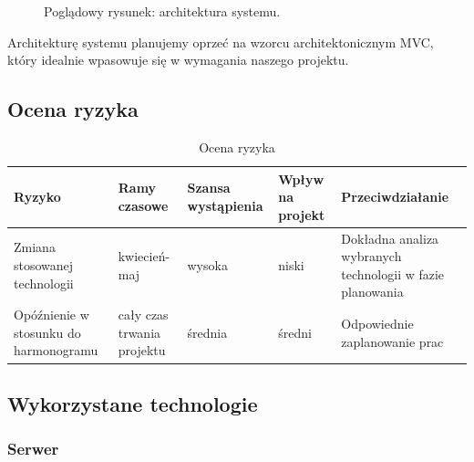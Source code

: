 \documentclass[12pt,a4paper]{report}
\begin{document}
\begin{figure}[H]
\centering
\caption{Poglądowy rysunek: architektura systemu.}
\label{im_overview}
\hspace*{0cm}
\end{figure}

Architekturę systemu planujemy oprzeć na wzorcu architektonicznym MVC, który idealnie wpasowuje się w wymagania naszego projektu.

\subsection{Ocena ryzyka}

\begin{table}[H]
\centering
\hspace{-1cm}
\caption{Ocena ryzyka}
\begin{tabular}{ | p{4cm} | p{2cm} | p{2cm} | p{2cm} | p{4cm} |}
\hline
Ryzyko & Ramy czasowe & Szansa wystąpienia & Wpływ na projekt & Przeciwdziałanie \\ \hline
    Zmiana stosowanej technologii & kwiecień-maj & wysoka & niski & Dokładna analiza wybranych technologii w fazie planowania \\ \hline
	Opóźnienie w stosunku do harmonogramu & cały czas trwania projektu & średnia & średni & Odpowiednie zaplanowanie prac \\ \hline
\end{tabular}
\end{table}

\subsection{Wykorzystane technologie}

\subsubsection{Serwer}
\end{document}
